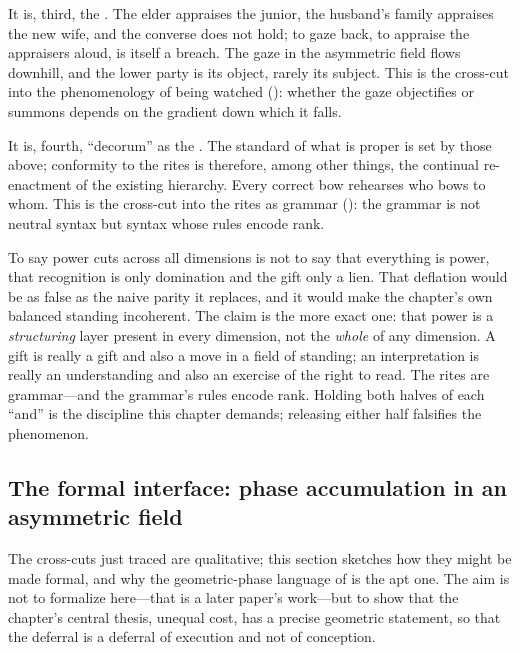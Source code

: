 It is, third, the . The elder appraises the junior, the husband's family appraises the new wife, and the converse does not hold; to gaze back, to appraise the appraisers aloud, is itself a breach. The gaze in the asymmetric field flows downhill, and the lower party is its object, rarely its subject. This is the cross-cut into the phenomenology of being watched (): whether the gaze objectifies or summons depends on the gradient down which it falls.

It is, fourth, ``decorum'' as the . The standard of what is proper is set by those above; conformity to the rites is therefore, among other things, the continual re-enactment of the existing hierarchy. Every correct bow rehearses who bows to whom. This is the cross-cut into the rites as grammar (): the grammar is not neutral syntax but syntax whose rules encode rank.

 To say power cuts across all dimensions is not to say that everything is power, that recognition is only domination and the gift only a lien. That deflation would be as false as the naive parity it replaces, and it would make the chapter's own balanced standing incoherent. The claim is the more exact one: that power is a \emph{structuring} layer present in every dimension, not the \emph{whole} of any dimension. A gift is really a gift and also a move in a field of standing; an interpretation is really an understanding and also an exercise of the right to read. The rites are grammar---and the grammar's rules encode rank. Holding both halves of each ``and'' is the discipline this chapter demands; releasing either half falsifies the phenomenon.

\subsection{The formal interface: phase accumulation in an asymmetric field}
The cross-cuts just traced are qualitative; this section sketches how they might be made formal, and why the geometric-phase language of  is the apt one. The aim is not to formalize here---that is a later paper's work---but to show that the chapter's central thesis, unequal cost, has a precise geometric statement, so that the deferral is a deferral of execution and not of conception.

